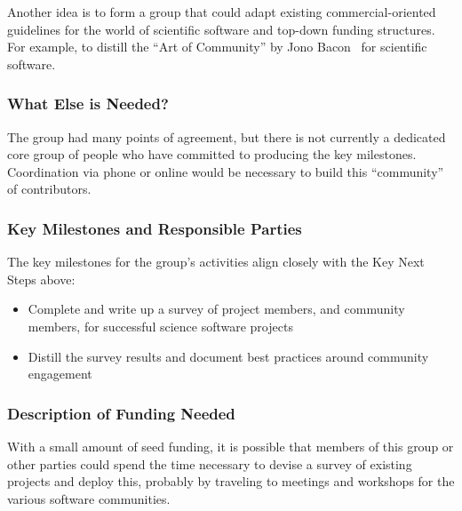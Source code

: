  Another idea is to form a group that could adapt existing commercial-oriented 
 guidelines for the world of scientific software and top-down funding structures.
 For example, to distill the ``Art of Community'' by Jono Bacon~\cite{art-of-community}
for scientific software.


\subsubsection{What Else is Needed?}

The group had many points of agreement, but there is not currently a dedicated core group
of people who have committed to producing the key milestones. Coordination via phone or
online would be necessary to build this ``community'' of contributors.

\subsubsection{Key Milestones and Responsible Parties}

The key milestones for the group's activities align closely with the Key Next Steps above:

\begin{itemize}
\item Complete and write up a survey of project members, and community members, for successful science software projects
\item Distill the survey results and document best practices around community engagement
\end{itemize}


\subsubsection{Description of Funding Needed}

With a small amount of seed funding, it is possible that members of this group or other parties could
spend the time necessary to devise a survey of existing projects and deploy this, probably by traveling to
meetings and workshops for the various software communities.
